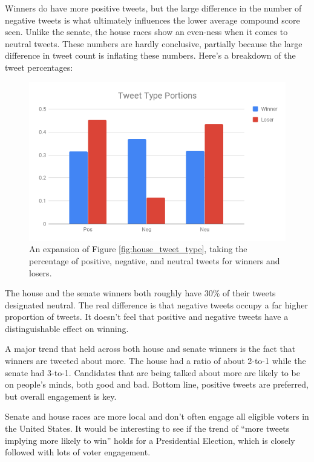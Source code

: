 \documentclass[11pt, twoside, reqno]{book}
\begin{document}
Winners do have more positive tweets, but the large difference in the number of negative tweets is what ultimately influences the lower average compound score seen. Unlike the senate, the house races show an even-ness when it comes to neutral tweets. These numbers are hardly conclusive, partially because the large difference in tweet count is inflating these numbers. Here's a breakdown of the tweet percentages:

\begin{figure}[H]
\centering
	\includegraphics[scale=0.5]{house_tweet_breakdown}
	\caption{An expansion of Figure \ref{fig:house_tweet_type}, taking the percentage of positive, negative, and neutral tweets for winners and losers.}\label{fig:house_tweet_breakdown}	
\end{figure}

The house and the senate winners both roughly have 30\% of their tweets designated neutral. The real difference is that negative tweets occupy a far higher proportion of tweets. It doesn't feel that positive and negative tweets have a distinguishable effect on winning. 

A major trend that held across both house and senate winners is the fact that winners are tweeted about more. The house had a ratio of about 2-to-1 while the senate had 3-to-1. Candidates that are being talked about more are likely to be on people's minds, both good and bad. Bottom line, positive tweets are preferred, but overall engagement is key. 

Senate and house races are more local and don't often engage all eligible voters in the United States. It would be interesting to see if the trend of ``more tweets implying more likely to win'' holds for a Presidential Election, which is closely followed with lots of voter engagement. 
\end{document}
